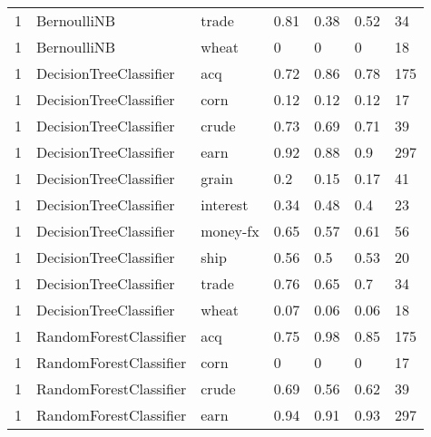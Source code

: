 \documentclass{article}
\begin{document}
\begin{table}[h]
\begin{tabular}{lllllll}
1             & BernoulliNB            & trade           & 0.81               & 0.38            & 0.52              & 34               \\
1             & BernoulliNB            & wheat           & 0                  & 0               & 0                 & 18               \\
1             & DecisionTreeClassifier & acq             & 0.72               & 0.86            & 0.78              & 175              \\
1             & DecisionTreeClassifier & corn            & 0.12               & 0.12            & 0.12              & 17               \\
1             & DecisionTreeClassifier & crude           & 0.73               & 0.69            & 0.71              & 39               \\
1             & DecisionTreeClassifier & earn            & 0.92               & 0.88            & 0.9               & 297              \\
1             & DecisionTreeClassifier & grain           & 0.2                & 0.15            & 0.17              & 41               \\
1             & DecisionTreeClassifier & interest        & 0.34               & 0.48            & 0.4               & 23               \\
1             & DecisionTreeClassifier & money-fx        & 0.65               & 0.57            & 0.61              & 56               \\
1             & DecisionTreeClassifier & ship            & 0.56               & 0.5             & 0.53              & 20               \\
1             & DecisionTreeClassifier & trade           & 0.76               & 0.65            & 0.7               & 34               \\
1             & DecisionTreeClassifier & wheat           & 0.07               & 0.06            & 0.06              & 18               \\
1             & RandomForestClassifier & acq             & 0.75               & 0.98            & 0.85              & 175              \\
1             & RandomForestClassifier & corn            & 0                  & 0               & 0                 & 17               \\
1             & RandomForestClassifier & crude           & 0.69               & 0.56            & 0.62              & 39               \\
1             & RandomForestClassifier & earn            & 0.94               & 0.91            & 0.93              & 297              \\\end{tabular}
\end{table}
\end{document}
